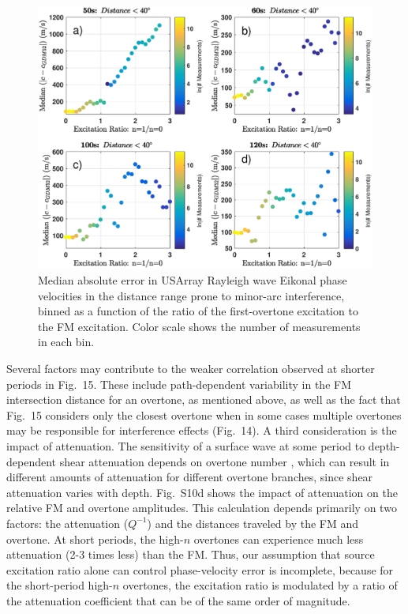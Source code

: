 \documentclass[extra,mreferee]{gji}
\begin{document}
\begin{figure}
 \includegraphics[width=1\textwidth]{Fig16.eps}
 \caption{Median absolute error in USArray Rayleigh wave Eikonal phase velocities in the distance range prone to minor-arc interference, binned as a function of the ratio of the first-overtone excitation to the FM excitation. Color scale shows the number of measurements in each bin.}
\end{figure}

Several factors may contribute to the weaker correlation observed at shorter periods in Fig.\ 15. These include path-dependent variability in the FM intersection distance for an overtone, as mentioned above, as well as the fact that Fig.\ 15 considers only the closest overtone when in some cases multiple overtones may be responsible for interference effects (Fig.\ 14). A third consideration is the impact of attenuation. The sensitivity of a surface wave at some period to depth-dependent shear attenuation depends on overtone number \citep{dahlen1998theoretical}, which can result in different amounts of attenuation for different overtone branches, since shear attenuation varies with depth. Fig.\ S10d shows the impact of attenuation on the relative FM and overtone amplitudes. This calculation depends primarily on two factors: the attenuation ($Q^{-1}$) and the distances traveled by the FM and overtone.  At short periods, the high-$n$ overtones can experience much less attenuation (2-3 times less) than the FM. Thus, our assumption that source excitation ratio alone can control phase-velocity error is incomplete, because for the short-period high-$n$ overtones, the  excitation ratio is modulated by a ratio of the attenuation coefficient that can be of the same order of magnitude.
\end{document}
